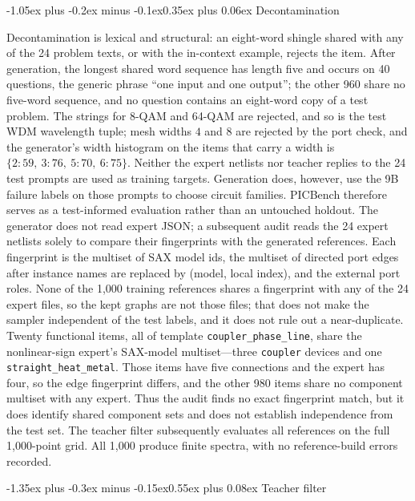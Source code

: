 \documentclass[11pt]{article}
\makeatletter
\renewcommand\section{\@startsection{section}{1}{\z@}%
  {-1.35ex plus -0.3ex minus -0.15ex}{0.55ex plus 0.08ex}%
  {\normalfont\large\bfseries}}
\renewcommand\subsection{\@startsection{subsection}{2}{\z@}%
  {-1.05ex plus -0.2ex minus -0.1ex}{0.35ex plus 0.06ex}%
  {\normalfont\normalsize\bfseries}}
\makeatother
\begin{document}
\subsection{Decontamination}
\label{sec:decontam}

Decontamination is lexical and structural: an eight-word shingle shared with any of the 24 problem texts, or with the in-context example, rejects the item.
After generation, the longest shared word sequence has length five and occurs on 40 questions, the generic phrase ``one input and one output''; the other 960 share no five-word sequence, and no question contains an eight-word copy of a test problem.
The strings for 8-QAM and 64-QAM are rejected, and so is the test WDM wavelength tuple; mesh widths $4$ and $8$ are rejected by the port check, and the generator's width histogram on the items that carry a width is $\{2: 59,\ 3: 76,\ 5: 70,\ 6: 75\}$.
Neither the expert netlists nor teacher replies to the 24 test prompts are used as training targets. Generation does, however, use the 9B failure labels on those prompts to choose circuit families. PICBench therefore serves as a test-informed evaluation rather than an untouched holdout. The generator does not read expert JSON; a subsequent audit reads the 24 expert netlists solely to compare their fingerprints with the generated references.
Each fingerprint is the multiset of SAX model ids, the multiset of directed port edges after instance names are replaced by (model, local index), and the external port roles.
None of the 1{,}000 training references shares a fingerprint with any of the 24 expert files, so the kept graphs are not those files; that does not make the sampler independent of the test labels, and it does not rule out a near-duplicate.
Twenty functional items, all of template \texttt{coupler\_phase\_line}, share the nonlinear-sign expert's SAX-model multiset---three \texttt{coupler} devices and one \texttt{straight\_heat\_metal}.
Those items have five connections and the expert has four, so the edge fingerprint differs, and the other 980 items share no component multiset with any expert.
Thus the audit finds no exact fingerprint match, but it does identify shared component sets and does not establish independence from the test set. The teacher filter subsequently evaluates all references on the full 1{,}000-point grid. All 1{,}000 produce finite spectra, with no reference-build errors recorded.

\section{Teacher filter}
\label{sec:teacher}
\end{document}
